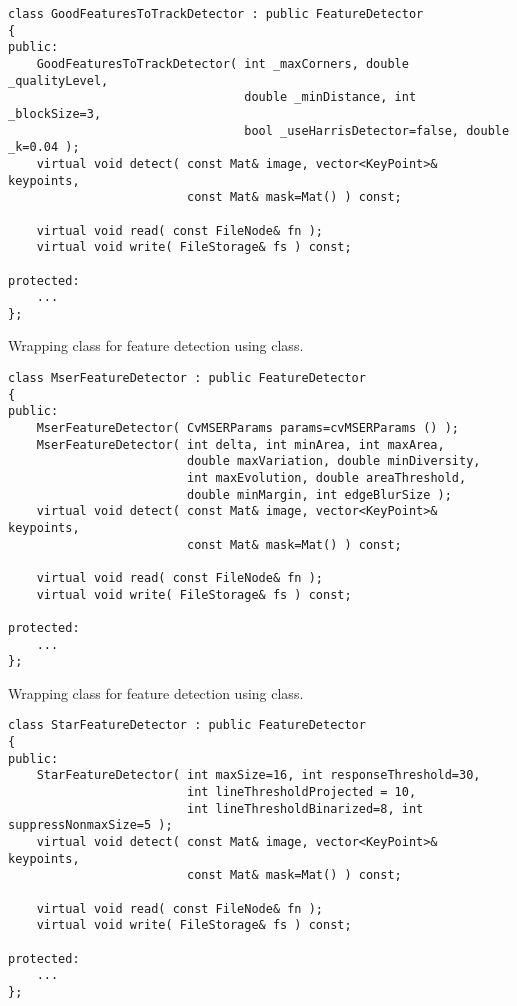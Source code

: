 \begin{lstlisting}
class GoodFeaturesToTrackDetector : public FeatureDetector
{
public:
    GoodFeaturesToTrackDetector( int _maxCorners, double _qualityLevel, 
                                 double _minDistance, int _blockSize=3, 
                                 bool _useHarrisDetector=false, double _k=0.04 );
    virtual void detect( const Mat& image, vector<KeyPoint>& keypoints, 
                         const Mat& mask=Mat() ) const;

    virtual void read( const FileNode& fn );
    virtual void write( FileStorage& fs ) const;

protected:
    ...
};
\end{lstlisting}

Wrapping class for feature detection using  class.

\begin{lstlisting}
class MserFeatureDetector : public FeatureDetector
{
public:
    MserFeatureDetector( CvMSERParams params=cvMSERParams () );
    MserFeatureDetector( int delta, int minArea, int maxArea, 
                         double maxVariation, double minDiversity,
                         int maxEvolution, double areaThreshold, 
                         double minMargin, int edgeBlurSize );
    virtual void detect( const Mat& image, vector<KeyPoint>& keypoints, 
                         const Mat& mask=Mat() ) const;

    virtual void read( const FileNode& fn );
    virtual void write( FileStorage& fs ) const;

protected:
    ...
};
\end{lstlisting}

Wrapping class for feature detection using  class.

\begin{lstlisting}
class StarFeatureDetector : public FeatureDetector
{
public:
    StarFeatureDetector( int maxSize=16, int responseThreshold=30, 
                         int lineThresholdProjected = 10,
                         int lineThresholdBinarized=8, int suppressNonmaxSize=5 );
    virtual void detect( const Mat& image, vector<KeyPoint>& keypoints, 
                         const Mat& mask=Mat() ) const;

    virtual void read( const FileNode& fn );
    virtual void write( FileStorage& fs ) const;

protected:
    ...
};
\end{lstlisting}

